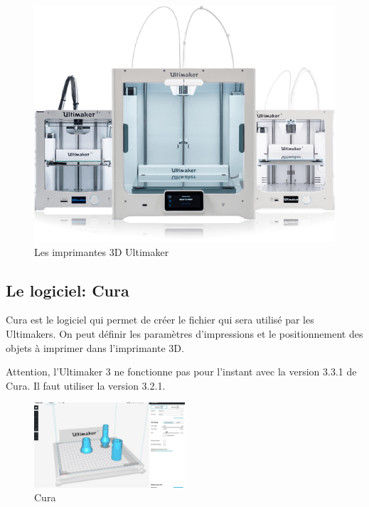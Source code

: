 \documentclass[a4paper, 11pt]{report}
\begin{document}
\begin{figure}[h]
	\begin{center}
		\includegraphics[scale=0.6]{images/ultimaker.png}
		\caption{Les imprimantes 3D Ultimaker}
	\end{center}
\end{figure}

\subsection{Le logiciel: Cura}
Cura est le logiciel qui permet de créer le fichier qui sera utilisé par les Ultimakers. On peut définir les paramètres d'impressions et le positionnement des objets à imprimer dans l'imprimante 3D. 

Attention, l'Ultimaker 3 ne fonctionne pas pour l'instant avec la version 3.3.1 de Cura. Il faut utiliser la version 3.2.1.

\begin{figure}[h]
	\begin{center}
		\includegraphics[width=0.5\textwidth]{images/cura.jpg}
		\caption{Cura}
	\end{center}
\end{figure}
\end{document}
